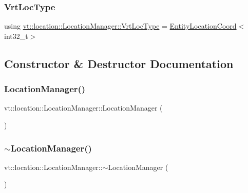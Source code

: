 \subsubsection{\texorpdfstring{Vrt\+Loc\+Type}{VrtLocType}}
{\footnotesize\ttfamily using \hyperlink{structvt_1_1location_1_1_location_manager_a06ec1698d93780afdf7873eeaa3a77b6}{vt\+::location\+::\+Location\+Manager\+::\+Vrt\+Loc\+Type} =  \hyperlink{structvt_1_1location_1_1_entity_location_coord}{Entity\+Location\+Coord}$<$int32\+\_\+t$>$}



\subsection{Constructor \& Destructor Documentation}
\mbox{\label{structvt_1_1location_1_1_location_manager_af5cf57c9ef31ccf5b207394cbd9363ee}} 
\subsubsection{\texorpdfstring{Location\+Manager()}{LocationManager()}}
{\footnotesize\ttfamily vt\+::location\+::\+Location\+Manager\+::\+Location\+Manager (\begin{DoxyParamCaption}{ }\end{DoxyParamCaption})\hspace{0.3cm}{\ttfamily [default]}}

\mbox{\label{structvt_1_1location_1_1_location_manager_abdcd3feb1f6e7c22f88582ad87799de1}} 
\subsubsection{\texorpdfstring{$\sim$\+Location\+Manager()}{~LocationManager()}}
{\footnotesize\ttfamily vt\+::location\+::\+Location\+Manager\+::$\sim$\+Location\+Manager (\begin{DoxyParamCaption}{ }\end{DoxyParamCaption})\hspace{0.3cm}{\ttfamily [virtual]}}




